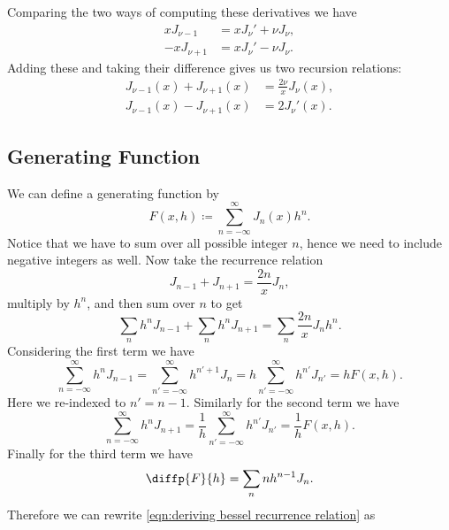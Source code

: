 \documentclass[fleqn]{NotesClass}
\begin{document}
    Comparing the two ways of computing these derivatives we have
    \begin{align}
        x J_{\nu - 1} &= x J_\nu' + \nu J_\nu,\\
        -x J_{\nu + 1} &= x J_\nu' - \nu J_\nu.
    \end{align}
    Adding these and taking their difference gives us two recursion relations:
    \begin{align}
        J_{\nu-1}(x) + J_{\nu + 1}(x) &= \frac{2\nu}{x} J_\nu(x),\\
        J_{\nu-1}(x) - J_{\nu + 1}(x) &= 2J_\nu'(x).
    \end{align}
    
    \subsection{Generating Function}
    We can define a generating function by
    \begin{equation}
        F(x, h) \coloneqq \sum_{n = -\infty}^{\infty} J_n(x) h^n.
    \end{equation}
    Notice that we have to sum over all possible integer \(n\), hence we need to include negative integers as well.
    Now take the recurrence relation
    \begin{equation}
        J_{n-1} + J_{n+1} = \frac{2n}{x}J_n,
    \end{equation}
    multiply by \(h^n\), and then sum over \(n\) to get
    \begin{equation}\label{eqn:deriving bessel recurrence relation}
        \sum_{n}h^nJ_{n-1} + \sum_{n}h^nJ_{n+1} = \sum_{n}\frac{2n}{x}J_nh^n.
    \end{equation}
    Considering the first term we have
    \begin{equation}
        \sum_{n=-\infty}^{\infty} h^nJ_{n-1} = \sum_{n'=-\infty}^{\infty} h^{n'+1} J_{n} = h\sum_{n'=-\infty}^{\infty} h^{n'}J_{n'} = hF(x, h).
    \end{equation}
    Here we re-indexed to \(n' = n - 1\).
    Similarly for the second term we have
    \begin{equation}
        \sum_{n=-\infty}^{\infty} h^nJ_{n+1} = \frac{1}{h} \sum_{n'=-\infty}^{\infty} h^{n'}J_{n'} = \frac{1}{h}F(x, h).
    \end{equation}
    Finally for the third term we have
    \begin{equation}
        \diffp{F}{h} = \sum_n nh^{n-1}J_n.
    \end{equation}
    Therefore we can rewrite \cref{eqn:deriving bessel recurrence relation} as
\end{document}
